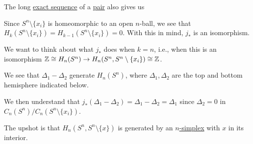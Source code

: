 The long \hyperref[def:exact-sequence]{exact sequence} of a \hyperref[def:good-pair]{pair} also gives us
\par
{}

\par Since \(S^n \setminus \{x_i\}\) is homeomorphic to an open \(n\)-ball, we see that \(H_k(S^n \setminus \{x_i\}) = H_{k - 1}(S^n \setminus \{x_i\}) = 0\).
With this in mind, \(j_\ast\) is an isomorphism.

We want to think about what \(j_\ast\) does when \(k = n\), i.e., when this is an isomorphism \(\mathbb{\MakeUppercase{z}}\cong H_n(S^n) \to H_n(S^n, S^n \setminus \{x_i\}) \cong \mathbb{Z}\).

We see that \(\Delta_1 - \Delta_2\) generate \(H_n(S^n)\), where \(\Delta_1, \Delta_2\) are the top and bottom hemisphere indicated below.
\begin{figure}[H]
	\centering
	\label{fig:les-on-relative-spheres}
\end{figure}
We then understand that \(j_\ast(\Delta_1 - \Delta_2) = \Delta_1 - \Delta_2 = \Delta_1\) since \(\Delta_2 = 0\) in \(C_n(S^n)/C_n(S^n \setminus \{x_i\})\).

The upshot is that \(H_n(S^n, S^n \setminus \{x\})\) is generated by an \hyperref[def:standard-simplex]{\(n\)-simplex} with \(x\) in its interior.

